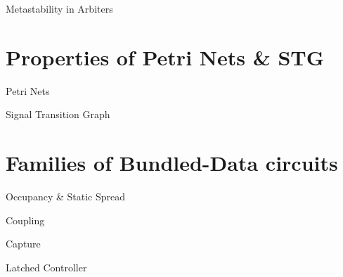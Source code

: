 \begin{frame}{Metastability in Arbiters}{\insertsection}
\end{frame}

\section{Properties of Petri Nets \& STG}
\begin{frame}{Petri Nets}{\insertsection}
\end{frame}
\begin{frame}{Signal Transition Graph}{\insertsection}
\end{frame}

\section{Families of Bundled-Data circuits}
\begin{frame}{Occupancy \& Static Spread}{\insertsection}
\end{frame}
\begin{frame}{Coupling}{\insertsection}
\end{frame}
\begin{frame}{Capture}{\insertsection}
\end{frame}
\begin{frame}{Latched Controller}{\insertsection}
\end{frame}